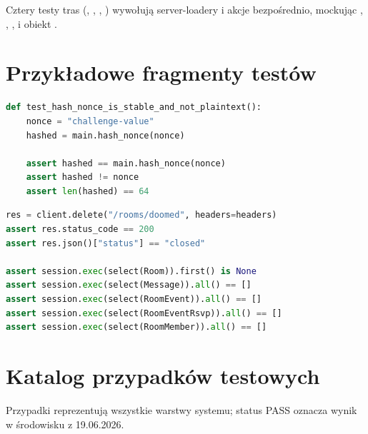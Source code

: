 Cztery testy tras (, , , ) wywołują
server-loadery i akcje bezpośrednio, mockując ,
, ,  i obiekt
.

\section{Przykładowe fragmenty testów}

\begin{lstlisting}[language=Python,caption={Test jednostkowy hashowania nonce (\texttt{backend/tests/test\_helpers.py}).}]
def test_hash_nonce_is_stable_and_not_plaintext():
    nonce = "challenge-value"
    hashed = main.hash_nonce(nonce)

    assert hashed == main.hash_nonce(nonce)
    assert hashed != nonce
    assert len(hashed) == 64
\end{lstlisting}

\begin{lstlisting}[language=Python,caption={Kaskadowe zamknięcie pokoju (\texttt{backend/tests/test\_admin.py}).}]
res = client.delete("/rooms/doomed", headers=headers)
assert res.status_code == 200
assert res.json()["status"] == "closed"

assert session.exec(select(Room)).first() is None
assert session.exec(select(Message)).all() == []
assert session.exec(select(RoomEvent)).all() == []
assert session.exec(select(RoomEventRsvp)).all() == []
assert session.exec(select(RoomMember)).all() == []
\end{lstlisting}

\section{Katalog przypadków testowych}
\label{sec:op-katalog}

Przypadki reprezentują wszystkie warstwy systemu; status PASS oznacza wynik w
środowisku z 19.06.2026.

